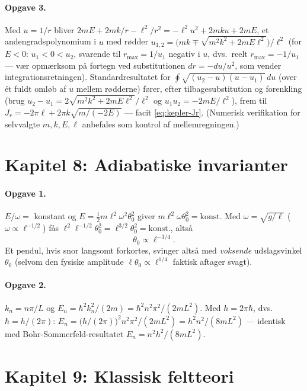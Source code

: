 \paragraph{Opgave 3.} Med $u=1/r$ bliver
$2mE+2mk/r-\ell^2/r^2=-\ell^2u^2+2mku+2mE$, et andengradspolynomium i
$u$ med rødder $u_{1,2}=\bigl(mk\mp\sqrt{m^2k^2+2mE\ell^2}\bigr)/\ell^2$
(for $E<0$: $u_1<0<u_2$, svarende til $r_{\max}=1/u_1$ negativ i
$u$, dvs.\ reelt $r_{\max}=-1/u_1$ — vær opmærksom på fortegn ved
substitutionen $dr=-du/u^2$, som vender integrationsretningen).
Standardresultatet for $\oint\sqrt{(u_2-u)(u-u_1)}\,du$ (over ét
fuldt omløb af $u$ mellem rødderne) fører, efter tilbagesubstitution
og forenkling (brug $u_2-u_1=2\sqrt{m^2k^2+2mE\ell^2}/\ell^2$ og
$u_1u_2=-2mE/\ell^2$), frem til
$J_r=-2\pi\ell+2\pi k\sqrt{m/(-2E)}$ — facit \eqref{eq:kepler-Jr}.
(Numerisk verifikation for selvvalgte $m,k,E,\ell$ anbefales som
kontrol af mellemregningen.)

\section*{Kapitel 8: Adiabatiske invarianter}

\paragraph{Opgave 1.} $E/\omega=$ konstant og
$E=\frac12m\ell^2\omega^2\theta_0^2$ giver
$m\ell^2\omega\theta_0^2=\text{konst.}$ Med $\omega=\sqrt{g/\ell}$
($\omega\propto\ell^{-1/2}$) fås $\ell^{2}\ell^{-1/2}\theta_0^2=\ell^{3/2}\theta_0^2=\text{konst.}$,
altså
\begin{equation*}
  \theta_0 \propto \ell^{-3/4}.
\end{equation*}
Et pendul, hvis snor langsomt forkortes, svinger altså med \emph{voksende}
udslagsvinkel $\theta_0$ (selvom den fysiske amplitude $\ell\theta_0\propto\ell^{1/4}$
faktisk aftager svagt).

\paragraph{Opgave 2.} $k_n=n\pi/L$ og $E_n=\hbar^2k_n^2/(2m)=\hbar^2n^2\pi^2/(2mL^2)$.
Med $h=2\pi\hbar$, dvs.\ $\hbar=h/(2\pi)$:
$E_n=\bigl(h/(2\pi)\bigr)^2n^2\pi^2/(2mL^2)=h^2n^2/(8mL^2)$ — identisk
med Bohr-Sommerfeld-resultatet $E_n=n^2h^2/(8mL^2)$.

\section*{Kapitel 9: Klassisk feltteori}

